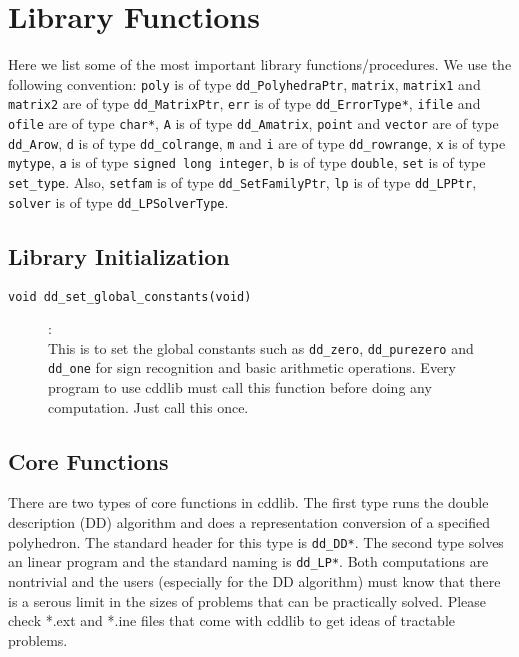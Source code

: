 \documentclass[11pt]{article}
\newcommand {\0} {{\bf 0}}
\begin{document}
\section{Library Functions}  \label{LIBRARY}

Here we list some of the most important library functions/procedures. 
We use the following convention: 
{\tt poly} is of type {\tt dd\_PolyhedraPtr},
{\tt matrix}, {\tt matrix1} and {\tt matrix2} are of type {\tt dd\_MatrixPtr},
{\tt err} is of type {\tt dd\_ErrorType*}, 
{\tt ifile} and {\tt ofile} are of type {\tt char*},
{\tt A} is of type {\tt dd\_Amatrix},
{\tt point} and {\tt vector} are of type {\tt dd\_Arow},
{\tt d} is of type {\tt dd\_colrange}, 
{\tt m} and {\tt i} are of type {\tt dd\_rowrange},
{\tt x} is of type {\tt mytype}, 
{\tt a} is of type {\tt signed long integer},
{\tt b} is of type {\tt double},
{\tt set} is of type {\tt set\_type}.
  Also,
{\tt setfam} is of type {\tt dd\_SetFamilyPtr},
{\tt lp} is of type {\tt dd\_LPPtr},
{\tt solver} is of type {\tt dd\_LPSolverType}.


\subsection{Library Initialization}  \label{Initialization}

\begin{description}

\item[{\tt void dd\_set\_global\_constants(void)}]:\\
This is to set the global constants such as {\tt dd\_zero},
{\tt dd\_purezero} and
{\tt dd\_one} for sign recognition and basic arithmetic
operations.  {Every program to use cddlib must call this function}
before doing any computation.    Just call this once.
\end{description}

\subsection{Core Functions}  \label{CoreLibrary}

There are two types of core functions in cddlib.  The first type
runs the double description (DD) algorithm and does a representation
conversion of a specified polyhedron.  The standard header
for this type is {\tt dd\_DD*}.  The second type solves
an linear program and the standard naming is
{\tt dd\_LP*}.   Both computations are nontrivial
and the users (especially for the DD algorithm) must
know that there is a serous limit in the sizes of problems
that can be practically solved. 
Please check *.ext and *.ine files that come with cddlib to get
ideas of tractable problems. 
\end{document}
